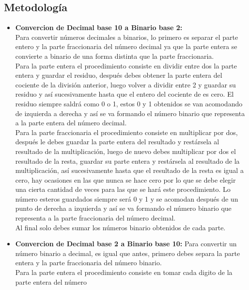 \documentclass[12pt]{article}
\begin{document}
		\begin{center}
			\section*{Metodología}\label{sec:Metodología}
		\end{center}
			\begin{itemize}
				\item \textbf{Convercion de Decimal base 10 a Binario base 2:}\\
					 Para convertir números decimales a binarios, lo primero es separar el parte entero y la parte 
					 fraccionaria del número decimal ya que la parte entera se convierte a binario de una forma distinta 
					 que la parte fraccionaria.\\
					 Para la parte entera el procedimiento consiste en dividir entre dos la parte entera y guardar el 
					 residuo, después debes obtener la parte entera del cociente de la división anterior, luego volver a 
					 dividir entre 2 y guardar su residuo y así sucesivamente hasta que el entero del cociente de es cero. 
					 El residuo siempre saldrá como 0 o 1, estos 0 y 1 obtenidos se van acomodando de izquierda a derecha 
					 y así se va formando el número binario que representa a la parte entera del número decimal.\\
					 Para la parte fraccionaria el procedimiento consiste en multiplicar por dos, después le debes guardar 
					 la parte entera del resultado y restársela al resultado de la multiplicación, luego de nuevo debes 
					 multiplicar por dos el resultado de la resta, guardar su parte entera y restársela al resultado de la 
					 multiplicación, así sucesivamente hasta que el resultado de la resta es igual a cero, hay ocasiones 
					 en las que nunca se hace cero por lo que se debe elegir una cierta cantidad de veces para las que se 
					 hará este procedimiento. Lo número esteros guardados siempre será 0 y 1 y se acomodan después 
					 de un punto de derecha a izquierda y así se va formando el número binario que representa a la parte 
					 fraccionaria del número decimal.\\
					 Al final solo debes sumar los números binario obtenidos de cada parte.
				\item \textbf{Convercion de Decimal base 2 a Binario base 10:}
					 Para convertir un número binario a decimal, es igual que antes, primero debes separa la parte entera 
					 y la parte fraccionaria del número binario.\\
					 Para la parte entera el procedimiento consiste en tomar cada digito de la parte entera del número 

\end{itemize}
\end{document}
